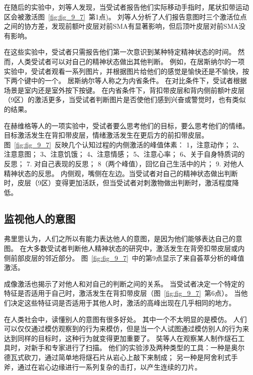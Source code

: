 在随后的实验中，刘等人\cite{lau2006measuring}发现，当受试者报告他们实际移动手指时，尾状扣带运动区会被激活图~\ref{fig:fig_9_7}~第1点)。
刘等人分析了人们报告意图时三个激活位点之间的协方差，发现前额叶皮层对前SMA有显著影响，但后顶叶皮层对前SMA没有影响。
\par


在这些实验中，受试者只需报告他们第一次意识到某种特定精神状态的时间。
然而，人类受试者可以对自己的精神状态做出其他判断。
例如，在居斯纳尔\cite{gusnard2001medial}的一项实验中，受试者观看一系列图片，并根据图片给他们的感觉是愉快还是不愉快，按下两个键中的一个。
居斯纳尔等人称之为内省条件。
在对比条件下，受试者根据场景是室内还是室外按下按键。
在内省条件下，背扣带皮层和背内侧前额叶皮层（9区）的激活更多，当受试者判断图片是否使他们感到兴奋或警觉时，也有类似的结果\cite{goldberg2006brain}。
\par


在赫维格等人\cite{herwig2010self}的一项实验中，受试者要么思考他们的目标，要么思考他们的情绪。
目标激活发生在背扣带皮层，情绪激活发生在更后方的前扣带皮层。
图~\ref{fig:fig_9_7}~反映几个认知过程的内侧激活的峰值体素：
1，注意动作；
2、注意意图；
3、注意饥饿；
4、注意情感；
5、注意心率；
6、关于自身特质词的反思；
7. 对自己表现的反思；
8（两个峰值），回忆自己生活中的片；
9. 对他人精神状态的反思。
内侧观，嘴侧在左边。当受试者对自己的精神状态做出判断时，皮层（9区）变得更加活跃，但当受试者对刺激物做出判断时，激活程度降低\cite{gusnard2001medial,herwig2010self}。



\subsection{监视他人的意图}
\par
弗里思\cite{frith2007making}认为，人们之所以有能力表达他人的意图，是因为他们能够表达自己的意图。
在大多数受试者判断他人精神状态的研究中，激活发生在背旁扣带皮层或内侧前部皮层的邻近部分\cite{amodio2006meeting}。
图~\ref{fig:fig_9_7}~中的第9点显示了来自荟萃分析的峰值激活\cite{gilbert2007distinct}。
\par


成像激活也揭示了对他人和对自己的判断之间的关系。
当受试者决定一个特定的特征是否适用于自己时，激活发生在背扣带皮层（图~\ref{fig:fig_9_7}~第6点）。
当他们决定这些特征词是否适用于其他人时，激活的高峰出现在几乎相同的地方\cite{ochsner2005neural}。
\par


在人类社会中，读懂别人的意图有很多好处。
其中一个不太明显的是模仿。
人们可以仅仅通过模仿观察到的行为来模仿，但是当一个人试图通过模仿别人的行为来达到同样的目标时，这种行为就变得更加重要了。
奘等人\cite{stout2011technology}在观察某人制作燧石工具时，对新手和专家进行了扫描。
他们的实验涉及两种类型的工具：一种是奥尔德瓦式砍刀，通过简单地将燧石片从岩心上敲下来制成；
另一种是阿舍利式手斧，通过在岩心边缘进行一系列复杂的击打，以产生连续的刀片。
\par


